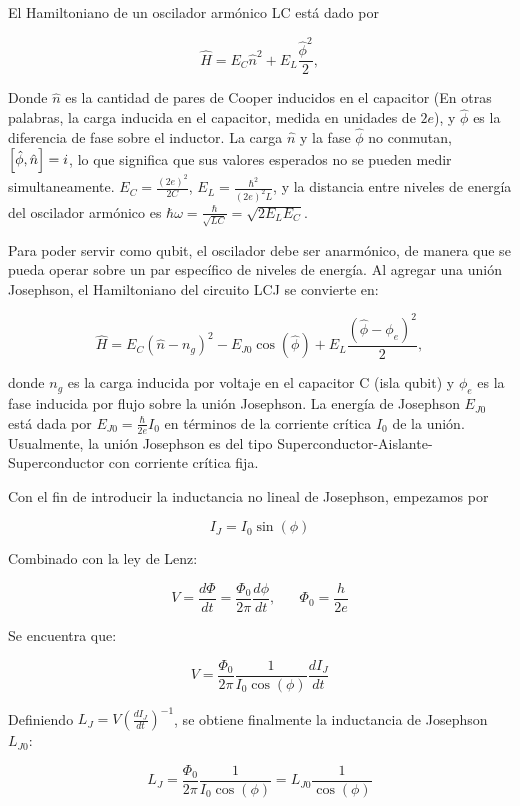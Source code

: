El Hamiltoniano de un oscilador armónico LC está dado por 

\begin{equation}
\hat{H} = E_C \hat{n}^2 + E_L \frac{\hat{\phi}^2}{2},
\end{equation}

Donde $\hat{n}$ es la cantidad de pares de Cooper inducidos en el capacitor (En otras palabras, la carga inducida en el capacitor, medida en unidades de $2e$), y $\hat{\phi}$ es la diferencia de fase sobre el inductor. La carga $\hat{n}$ y la fase $\hat{\phi}$ no conmutan, $\comm{\hat{\phi}}{\hat{n}}=i$, lo que significa que sus valores esperados no se pueden medir simultaneamente. $E_C=\frac{(2e)^2}{2C}$, $E_L=\frac{\hbar^2}{(2e)^2L}$, y la distancia entre niveles de energía del oscilador armónico es $\hbar \omega = \frac{\hbar}{\sqrt{LC}}=\sqrt{2E_LE_C}$.

Para poder servir como qubit, el oscilador debe ser anarmónico, de manera que se pueda operar sobre un par específico de niveles de energía. Al agregar una unión Josephson, el Hamiltoniano del circuito LCJ se convierte en:

\[
\hat{H} = E_C (\hat{n}-n_g)^2 - E_{J0} \cos( \hat{\phi} ) + E_L \frac{(\hat{\phi}-\phi_e)^2}{2},
\]

donde $n_g$ es la carga inducida por voltaje en el capacitor C (isla qubit) y $\phi_e$ es la fase inducida por flujo sobre la unión Josephson. La energía de Josephson $E_{J0}$ está dada por $E_{J0}=\frac{\hbar}{2e}I_0$ en términos de la corriente crítica $I_0$ de la unión. Usualmente, la unión Josephson es del tipo Superconductor-Aislante-Superconductor con corriente crítica fija.

Con el fin de introducir la inductancia no lineal de Josephson, empezamos por 

\[
I_J = I_0 \sin(\phi)
\]

Combinado con la ley de Lenz:

\[
V = \frac{d\Phi}{dt} = \frac{\Phi_0}{2\pi} \frac{d\phi}{dt}, \hspace{20pt} \Phi_0=\frac{h}{2e}
\]

Se encuentra que:

\[
V = \frac{\Phi_0}{2\pi} \frac{1}{I_0\cos(\phi)} \frac{dI_J}{dt}
\]

Definiendo $L_J = V (\frac{dI_J}{dt})^{-1}$, se obtiene finalmente la inductancia de Josephson $L_{J0}$:

\[
L_J = \frac{\Phi_0}{2\pi} \frac{1}{I_0 \cos(\phi)} = L_{J0} \frac{1}{\cos(\phi)}
\]

